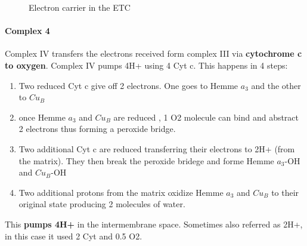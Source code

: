 \documentclass[../main.tex]{subfiles}
\begin{document}
\begin{figure}[H]
	\centering
	\hfil
	\caption{Electron carrier in the ETC}
\end{figure}

\paragraph{Complex 4}
Complex IV transfers the electrons received form complex III via \textbf{cytochrome c to oxygen}. Complex IV pumps 4H+ using 4 Cyt c. This happens in 4 steps: 
\begin{enumerate}
	\item Two reduced Cyt c give off 2 electrons. One goes to Hemme $a_{3}$ and the other to $Cu_{B}$
	\item once Hemme $a_{3}$ and $Cu_{B}$ are reduced , 1 O2 molecule can bind and abstract 2 electrons thus forming a peroxide bridge.
	\item Two additional Cyt c are reduced transferring their electrons to 2H+ (from the matrix). They then break the peroxide bridege and forme Hemme $a_{3}$-OH and $Cu_{B}$-OH
	\item Two additional protons from the matrix oxidize Hemme $a_{3}$ and $Cu_{B}$ to their original state producing 2 molecules of water. 
\end{enumerate}
\noindent This \textbf{pumps 4H+} in the intermembrane space. Sometimes also referred as 2H+, in this case it used 2 Cyt and 0.5 O2. 
\end{document}
